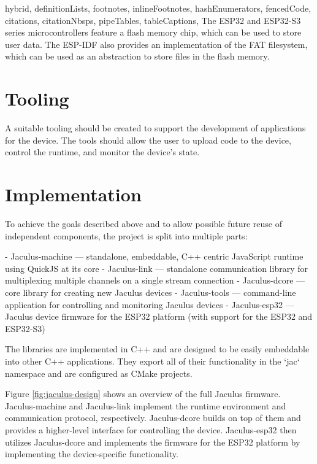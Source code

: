 \begin{markdown*}{%
  hybrid,
  definitionLists,
  footnotes,
  inlineFootnotes,
  hashEnumerators,
  fencedCode,
  citations,
  citationNbsps,
  pipeTables,
  tableCaptions,
}
The ESP32 and ESP32-S3 series microcontrollers feature a flash memory chip, which can be used to store user data. The ESP-IDF also provides an implementation of the FAT filesystem, which can be used as an abstraction to store files in the flash memory.

\section{Tooling}

A suitable tooling should be created to support the development of applications for the device. The tools should allow the user to upload code to the device, control the runtime, and monitor the device's state.

\section{Implementation}


To achieve the goals described above and to allow possible future reuse of independent components, the project is split into multiple parts:

  - Jaculus-machine --- standalone, embeddable, C++ centric JavaScript runtime using QuickJS at its core
  - Jaculus-link --- standalone communication library for multiplexing multiple channels on a single stream connection
  - Jaculus-dcore --- core library for creating new Jaculus devices
  - Jaculus-tools --- command-line application for controlling and monitoring Jaculus devices
  - Jaculus-esp32 --- Jaculus device firmware for the ESP32 platform (with support for the ESP32 and ESP32-S3)

The libraries are implemented in C++ and are designed to be easily embeddable into other C++ applications. They export all of their functionality in the `jac` namespace and are configured as CMake projects.

Figure \ref{fig:jaculus-design} shows an overview of the full Jaculus firmware. Jaculus-machine and Jaculus-link implement the runtime environment and communication protocol, respectively. Jaculus-dcore builds on top of them and provides a higher-level interface for controlling the device. Jaculus-esp32 then utilizes Jaculus-dcore and implements the firmware for the ESP32 platform by implementing the device-specific functionality.


\end{markdown*}

